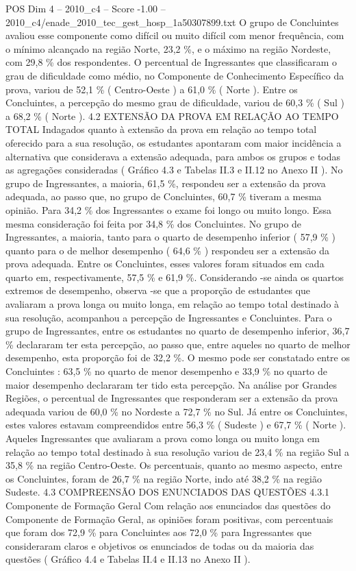 \begin{textsample}{POS Dim 4 – 2010\_c4 – Score -1.00 – 2010\_c4/enade\_2010\_tec\_gest\_hosp\_1a50307899.txt}
O grupo de Concluintes avaliou esse componente como difícil ou muito difícil com menor frequência, com o mínimo alcançado na região Norte, 23,2 \%, e o máximo na região Nordeste, com 29,8 \% dos respondentes.
O percentual de Ingressantes que classificaram o grau de dificuldade como médio, no Componente de Conhecimento Específico da prova, variou de 52,1 \% ( Centro-Oeste ) a 61,0 \% ( Norte ).
Entre os Concluintes, a percepção do mesmo grau de dificuldade, variou de 60,3 \% ( Sul ) a 68,2 \% ( Norte ). 4.2 EXTENSÃO DA PROVA EM RELAÇÃO AO TEMPO TOTAL Indagados quanto à extensão da prova em relação ao tempo total oferecido para a sua resolução, os estudantes apontaram com maior incidência a alternativa que considerava a extensão adequada, para ambos os grupos e todas as agregações consideradas ( Gráfico 4.3 e Tabelas II.3 e II.12 no Anexo II ).
No grupo de Ingressantes, a maioria, 61,5 \%, respondeu ser a extensão da prova adequada, ao passo que, no grupo de Concluintes, 60,7 \% tiveram a mesma opinião.
Para 34,2 \% dos Ingressantes o exame foi longo ou muito longo.
Essa mesma consideração foi feita por 34,8 \% dos Concluintes.
No grupo de Ingressantes, a maioria, tanto para o quarto de desempenho inferior ( 57,9 \% ) quanto para o de melhor desempenho ( 64,6 \% ) respondeu ser a extensão da prova adequada.
Entre os Concluintes, esses valores foram situados em cada quarto em, respectivamente, 57,5 \% e 61,9 \%.
Considerando -se ainda os quartos extremos de desempenho, observa -se que a proporção de estudantes que avaliaram a prova longa ou muito longa, em relação ao tempo total destinado à sua resolução, acompanhou a percepção de Ingressantes e Concluintes.
Para o grupo de Ingressantes, entre os estudantes no quarto de desempenho inferior, 36,7 \% declararam ter esta percepção, ao passo que, entre aqueles no quarto de melhor desempenho, esta proporção foi de 32,2 \%.
O mesmo pode ser constatado entre os Concluintes : 63,5 \% no quarto de menor desempenho e 33,9 \% no quarto de maior desempenho declararam ter tido esta percepção.
Na análise por Grandes Regiões, o percentual de Ingressantes que responderam ser a extensão da prova adequada variou de 60,0 \% no Nordeste a 72,7 \% no Sul.
Já entre os Concluintes, estes valores estavam compreendidos entre 56,3 \% ( Sudeste ) e 67,7 \% ( Norte ).
Aqueles Ingressantes que avaliaram a prova como longa ou muito longa em relação ao tempo total destinado à sua resolução variou de 23,4 \% na região Sul a 35,8 \% na região Centro-Oeste.
Os percentuais, quanto ao mesmo aspecto, entre os Concluintes, foram de 26,7 \% na região Norte, indo até 38,2 \% na região Sudeste. 4.3 COMPREENSÃO DOS ENUNCIADOS DAS QUESTÕES 4.3.1 Componente de Formação Geral Com relação aos enunciados das questões do Componente de Formação Geral, as opiniões foram positivas, com percentuais que foram dos 72,9 \% para Concluintes aos 72,0 \% para Ingressantes que consideraram claros e objetivos os enunciados de todas ou da maioria das questões ( Gráfico 4.4 e Tabelas II.4 e II.13 no Anexo II ).

\end{textsample}
